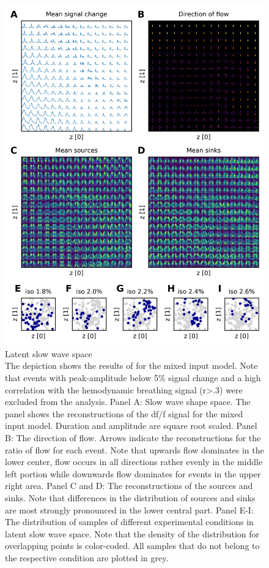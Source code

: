 \begin{figure}[!htb]
\centering
\includegraphics[width=\textwidth,height=\textheight,keepaspectratio]{Figures/latent_slow_wave_space}
\decoRule
\caption[Latent slow wave space]{Latent slow wave space\\The depiction shows the results of for the mixed input model. Note that events with peak-amplitude below 5\% signal change and a high correlation with the hemodynamic breathing signal (r>.3) were excluded from the analysis. Panel A: Slow wave shape space. The panel shows the reconstructions of the df/f signal for the mixed input model. Duration and amplitude are square root scaled. Panel B: The direction of flow. Arrows indicate the reconstructions for the ratio of flow for each event. Note that upwards flow dominates in the lower center, flow occurs in all directions rather evenly in the middle left portion while downwards flow dominates for events in the upper right area. Panel C and D: The reconstructions of the sources and sinks. Note that differences in the distribution of sources and sinks are most strongly pronounced in the lower central part. Panel E-I: The distribution of samples of different experimental conditions in latent slow wave space. Note that the density of the distribution for overlapping points is color-coded. All samples that do not belong to the respective condition are plotted in grey.}
\label{fig:latent_slow_wave_space}
\end{figure}
